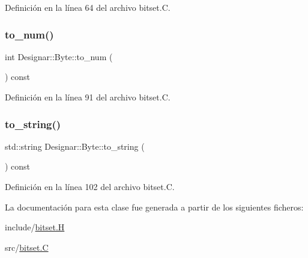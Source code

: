 Definición en la línea 64 del archivo bitset.\+C.

\mbox{\label{class_designar_1_1_byte_a1f10a6e5ad399f62c0d53ace68c7e43d}} 
\subsubsection{\texorpdfstring{to\+\_\+num()}{to\_num()}}
{\footnotesize\ttfamily int Designar\+::\+Byte\+::to\+\_\+num (\begin{DoxyParamCaption}{ }\end{DoxyParamCaption}) const}



Definición en la línea 91 del archivo bitset.\+C.

\mbox{\label{class_designar_1_1_byte_afddf5962874234208805ece07f31916d}} 
\subsubsection{\texorpdfstring{to\+\_\+string()}{to\_string()}}
{\footnotesize\ttfamily std\+::string Designar\+::\+Byte\+::to\+\_\+string (\begin{DoxyParamCaption}{ }\end{DoxyParamCaption}) const}



Definición en la línea 102 del archivo bitset.\+C.



La documentación para esta clase fue generada a partir de los siguientes ficheros\+:\begin{DoxyCompactItemize}
\item 
include/\hyperlink{bitset_8_h}{bitset.\+H}\item 
src/\hyperlink{bitset_8_c}{bitset.\+C}\end{DoxyCompactItemize}
